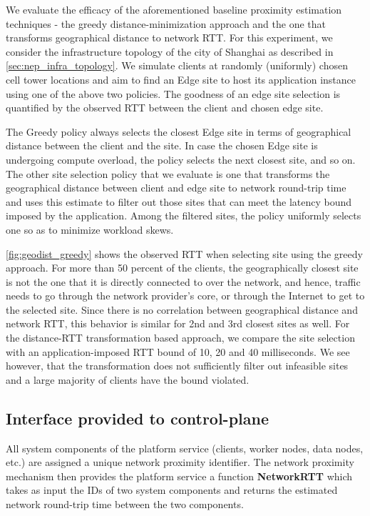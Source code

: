 \par We evaluate the efficacy of the aforementioned baseline proximity estimation techniques - the greedy distance-minimization approach and the one that transforms geographical distance to network RTT. For this experiment, we consider the infrastructure topology of the city of Shanghai as described in \cref{sec:nep_infra_topology}. We simulate clients at randomly (uniformly) chosen cell tower locations and aim to find an Edge site to host its application instance using one of the above two policies. The goodness of an edge site selection is quantified by the observed RTT between the client and chosen edge site. 
\par The Greedy policy always selects the closest Edge site in terms of geographical distance between the client and the site. In case the chosen Edge site is undergoing compute overload, the policy selects the next closest site, and so on. The other site selection policy that we evaluate is one that transforms the geographical distance between client and edge site to network round-trip time and uses this estimate to filter out those sites that can meet the latency bound imposed by the application. Among the filtered sites, the policy uniformly selects one so as to minimize workload skews.
\par \cref{fig:geodist_greedy} shows the observed RTT when selecting site using the greedy approach. For more than 50 percent of the clients, the geographically closest site is not the one that it is directly connected to over the network, and hence, traffic needs to go through the network provider's core, or through the Internet to get to the selected site. Since there is no correlation between geographical distance and network RTT, this behavior is similar for 2nd and 3rd closest sites as well. For the distance-RTT transformation based approach, we compare the site selection with an application-imposed RTT bound of 10, 20 and 40 milliseconds. We see however, that the transformation does not sufficiently filter out infeasible sites and a large majority of clients have the bound violated.

\subsection{Interface provided to control-plane}
All system components of the platform service (clients, worker nodes, data nodes, etc.) are assigned a unique network proximity identifier. The network proximity mechanism then provides the platform service a function \textbf{NetworkRTT} which takes as input the IDs of two system components and returns the estimated network round-trip time between the two components. 

